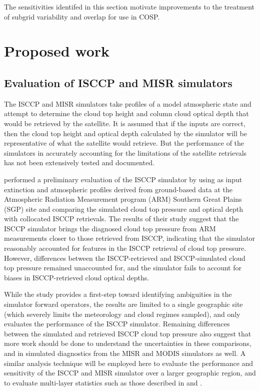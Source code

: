 \documentclass[letter]{article}
\begin{document}
The sensitivities identifed in this section motivate improvements to the treatment of subgrid variability and overlap for use in COSP.

\section{Proposed work}

\subsection{Evaluation of ISCCP and MISR simulators}
The ISCCP and MISR simulators take profiles of a model atmospheric state and attempt to determine the cloud top height and column cloud optical depth that would be retrieved by the satellite. It is assumed that if the inputs are correct, then the cloud top height and optical depth calculated by the simulator will be representative of what the satellite would retrieve. But the performance of the simulators in accurately accounting for the limitations of the satellite retrievals has not been extensively tested and documented.

\cite{mace_et_al_2010} performed a preliminary evaluation of the ISCCP simulator by using as input extinction and atmospheric profiles derived from ground-based data at the Atmospheric Radiation Measurement program (ARM) Southern Great Plains (SGP) site and comparing the simulated cloud top pressure and optical depth with collocated ISCCP retrievals. The results of their study suggest that the ISCCP simulator brings the diagnosed cloud top pressure from ARM measurements closer to those retrieved from ISCCP, indicating that the simulator reasonably accounted for features in the ISCCP retrieval of cloud top pressure. However, differences between the ISCCP-retrieved and ISCCP-simulated cloud top pressure remained unaccounted for, and the simulator fails to account for biases in ISCCP-retrieved cloud optical depths. 

While the \cite{mace_et_al_2010} study provides a first-step toward identifying ambiguities in the simulator forward operators, the results are limited to a single geographic site (which severely limits the meteorology and cloud regimes sampled), and only evaluates the performance of the ISCCP simulator. Remaining differences between the simulated and retrieved ISCCP cloud top pressure also suggest that more work should be done to understand the uncertainties in these comparisons, and in simulated diagnostics from the MISR and MODIS simulators as well. A similar analysis technique will be employed here to evaluate the performance and sensitivity of the ISCCP and MISR simulator over a larger geographic region, and to evaluate multi-layer statistics such as those described in \cite{marchand_et_al_2010} and \cite{marchand_and_ackerman_2010}.
\end{document}
